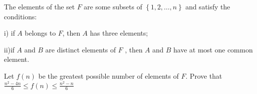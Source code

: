 The elements of the set $F$ are some subsets of $\left\{1,2,\ldots ,n\right\}$ and satisfy the conditions:

i) if $A$ belongs to $F$,  then $A$ has three elements;

ii)if $A$ and $B$ are distinct elements of $F$ , then $A$ and $B$ have at most one common element.

Let $f(n)$ be the greatest possible number of elements of $F$. Prove that $\frac{n^{2}-4n}{6}\leq  f(n) \leq  \frac{n^{2}-n}{6}$